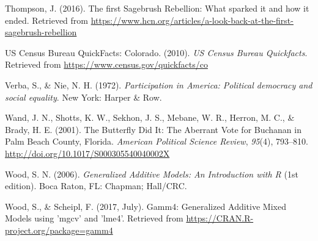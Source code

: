 \documentclass[12pt,twoside]{reedthesis}
\begin{document}
  \hypertarget{ref-thompson_first_2016}{}
  Thompson, J. (2016). The first Sagebrush Rebellion: What sparked it and
  how it ended. Retrieved from
  \url{https://www.hcn.org/articles/a-look-back-at-the-first-sagebrush-rebellion}
  
  \hypertarget{ref-us_census_bureau_us_2010}{}
  US Census Bureau QuickFacts: Colorado. (2010). \emph{US Census Bureau
  Quickfacts}. Retrieved from \url{https://www.census.gov/quickfacts/co}
  
  \hypertarget{ref-verba_participation_1972}{}
  Verba, S., \& Nie, N. H. (1972). \emph{Participation in America:
  Political democracy and social equality}. New York: Harper \& Row.
  
  \hypertarget{ref-wand_butterfly_2001}{}
  Wand, J. N., Shotts, K. W., Sekhon, J. S., Mebane, W. R., Herron, M. C.,
  \& Brady, H. E. (2001). The Butterfly Did It: The Aberrant Vote for
  Buchanan in Palm Beach County, Florida. \emph{American Political Science
  Review}, \emph{95}(4), 793--810.
  \url{http://doi.org/10.1017/S000305540040002X}
  
  \hypertarget{ref-wood_generalized_2006}{}
  Wood, S. N. (2006). \emph{Generalized Additive Models: An Introduction
  with R} (1st edition). Boca Raton, FL: Chapman; Hall/CRC.
  
  \hypertarget{ref-wood_gamm4:_2017}{}
  Wood, S., \& Scheipl, F. (2017, July). Gamm4: Generalized Additive Mixed
  Models using 'mgcv' and 'lme4'. Retrieved from
  \url{https://CRAN.R-project.org/package=gamm4}


\end{document}
